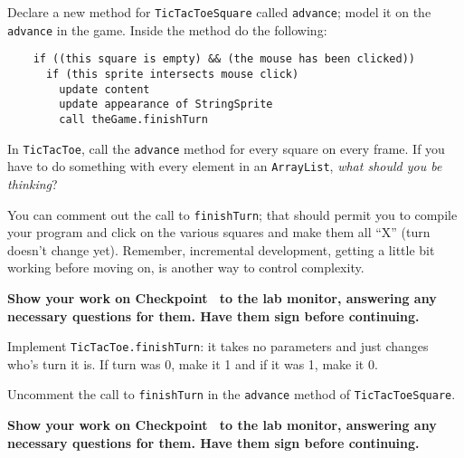 \documentclass[12pt,oneside]{memoir}
\newcommand\code[1]{\lstinline^#1^}
\newenvironment{Checkpoint}[1]{%
  \begin{Exercise}[name={Checkpoint},title={#1}]}{%
  \end{Exercise}%
  \textbf{Show your work on Checkpoint~\theExercise{} to the lab monitor, %
    answering any necessary questions for them.  Have them sign before continuing.}}
\begin{document}
\begin{Checkpoint}{Square advance}
  Declare a new method for \code{TicTacToeSquare} called \code{advance};
  model it on the \code{advance} in the game. Inside the method do the
  following:

  \begin{lstlisting}
    if ((this square is empty) && (the mouse has been clicked)) 
      if (this sprite intersects mouse click)
        update content
        update appearance of StringSprite
        call theGame.finishTurn
  \end{lstlisting}

  In \code{TicTacToe}, call the \code{advance} method for every square
  on every frame. If you have to do something with every element in an
  \code{ArrayList}, \emph{what should you be thinking}?

  You can comment out the call to \code{finishTurn}; that should permit
  you to compile your program and click on the various squares and make
  them all ``X'' (turn doesn't change yet). Remember, incremental
  development, getting a little bit working before moving on, is another
  way to control complexity.  
\end{Checkpoint}

\begin{Checkpoint}{Finish turn}
  Implement \code{TicTacToe.finishTurn}: it takes no
  parameters and just changes who's turn it is. If turn was 0, make it 1
  and if it was 1, make it 0.

  Uncomment the call to \code{finishTurn} in the \code{advance} method
  of \code{TicTacToeSquare}.  
\end{Checkpoint}
\end{document}

